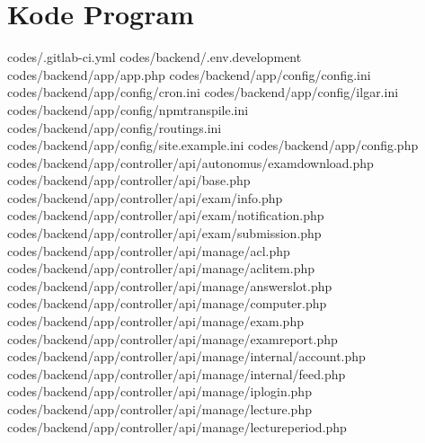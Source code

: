 \chapter{Kode Program}
\label{lamp:B}
codes/.gitlab-ci.yml
codes/backend/.env.development
codes/backend/app/app.php
codes/backend/app/config/config.ini
codes/backend/app/config/cron.ini
codes/backend/app/config/ilgar.ini
codes/backend/app/config/npmtranspile.ini
codes/backend/app/config/routings.ini
codes/backend/app/config/site.example.ini
codes/backend/app/config.php
codes/backend/app/controller/api/autonomus/examdownload.php
codes/backend/app/controller/api/base.php
codes/backend/app/controller/api/exam/info.php
codes/backend/app/controller/api/exam/notification.php
codes/backend/app/controller/api/exam/submission.php
codes/backend/app/controller/api/manage/acl.php
codes/backend/app/controller/api/manage/aclitem.php
codes/backend/app/controller/api/manage/answerslot.php
codes/backend/app/controller/api/manage/computer.php
codes/backend/app/controller/api/manage/exam.php
codes/backend/app/controller/api/manage/examreport.php
codes/backend/app/controller/api/manage/internal/account.php
codes/backend/app/controller/api/manage/internal/feed.php
codes/backend/app/controller/api/manage/iplogin.php
codes/backend/app/controller/api/manage/lecture.php
codes/backend/app/controller/api/manage/lectureperiod.php
